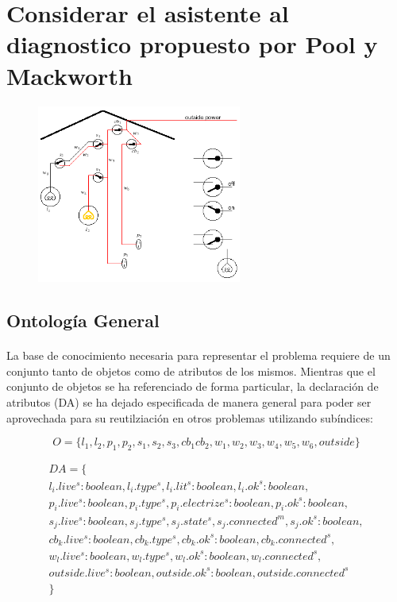 \documentclass[10pt, a4paper,spanish]{article}
\begin{document}
	\clearpage
	\section{Considerar el asistente al diagnostico propuesto por Pool y Mackworth}

		\begin{figure}[H]
			\begin{center}
				\includegraphics[width=0.6\textwidth]{diagnostic-assistant}
			\end{center}
		\end{figure}

		\subsection{Ontología General}

			\paragraph{}
			La base de conocimiento necesaria para representar el problema requiere de un conjunto tanto de objetos como de atributos de los mismos. Mientras que el conjunto de objetos se ha referenciado de forma particular, la declaración de atributos (DA) se ha dejado especificada de manera general para poder ser aprovechada para su reutilziación en otros problemas utilizando subíndices:

			\begin{equation*}
				O = \{l_1, l_2, p_1, p_2, s_1, s_2, s_3, cb_1 cb_2, w_1, w_2, w_3, w_4, w_5, w_6, outside\}
			\end{equation*}

			\begin{multline*}
				DA = \{ \\
					l_i.live^s:boolean, l_i.type^s, l_i.lit^s:boolean, l_i.ok^s:boolean, \\
					p_i.live^s:boolean, p_i.type^s, p_i.electrize^s:boolean, p_i.ok^s:boolean, \\
					s_j.live^s:boolean, s_j.type^s, s_j.state^s, s_j.connected^m, s_j.ok^s:boolean, \\
					cb_k.live^s:boolean, cb_k.type^s, cb_k.ok^s:boolean, cb_k.connected^s, \\
					w_l.live^s:boolean, w_l.type^s, w_l.ok^s:boolean, w_l.connected^s, \\
					outside.live^s:boolean, outside.ok^s:boolean, outside.connected^s \\
				\}
			\end{multline*}
\end{document}
